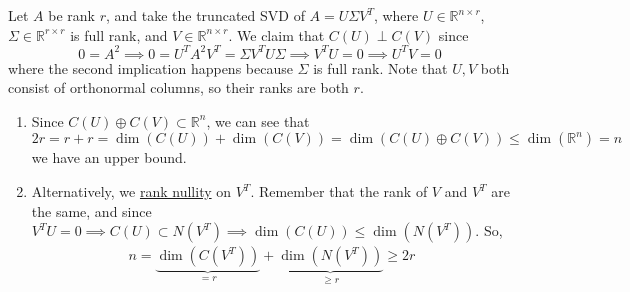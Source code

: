 	\begin{solution}
		Let $A$ be rank $r$, and take the truncated SVD of $A = U \Sigma V^T$, where $U \in \mathbb{R}^{n \times r}$, $\Sigma \in \mathbb{R}^{r \times r}$ is full rank, and $V \in \mathbb{R}^{n \times r}$. We claim that $C(U) \perp C(V)$ since 
		\begin{equation}
			0 = A^2 \implies 0 = U^T A^2 V^T = \Sigma V^T U \Sigma \implies V^T U = 0 \implies U^T V = 0
		\end{equation}
		where the second implication happens because $\Sigma$ is full rank. Note that $U, V$ both consist of orthonormal columns, so their ranks are both $r$. 
		\begin{enumerate}
		  \item Since $C(U) \oplus C(V) \subset \mathbb{R}^n$, we can see that 
				\begin{equation}
					2r = r + r = \dim(C(U)) + \dim(C(V)) = \dim(C(U) \oplus C(V)) \leq \dim(\mathbb{R}^n) = n
				\end{equation}
				we have an upper bound. 

			\item Alternatively, we \hyperref[thm:rank-nullity-theorem]{rank nullity} on $V^T$. Remember that the rank of $V$ and $V^T$ are the same, and since $V^T U = 0 \implies C(U) \subset N(V^T) \implies \dim(C(U)) \leq \dim(N(V^T))$. So, 
				\begin{align}
					n = \underbrace{\dim(C(V^T))}_{= r} + \underbrace{\dim(N(V^T))}_{\geq r} \geq 2r
				\end{align}
		\end{enumerate}
	\end{solution}

